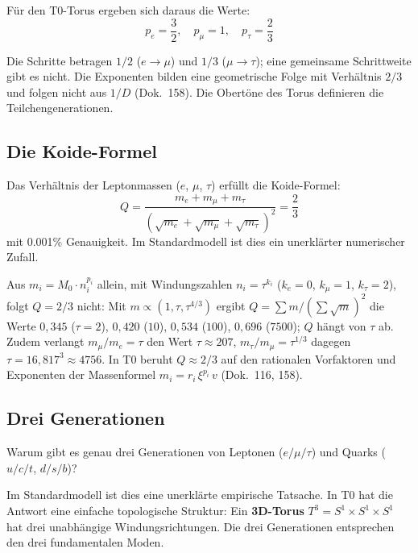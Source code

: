 	Für den T0-Torus ergeben sich daraus die Werte:
	\begin{equation}
		p_e = \frac{3}{2}, \quad p_\mu = 1, \quad p_\tau = \frac{2}{3}
	\end{equation}
	
	Die Schritte betragen $1/2$ ($e \to \mu$) und $1/3$ ($\mu \to \tau$); eine gemeinsame Schrittweite gibt es nicht. Die Exponenten bilden eine geometrische Folge mit Verhältnis $2/3$ und folgen nicht aus $1/D$ (Dok.~158). Die Obertöne des Torus definieren die Teilchengenerationen.
	
	\subsection{Die Koide-Formel}
	
	Das Verhältnis der Leptonmassen ($e$, $\mu$, $\tau$) erfüllt die Koide-Formel:
	\begin{equation}
		Q = \frac{m_e + m_\mu + m_\tau}{\left(\sqrt{m_e} + \sqrt{m_\mu} + \sqrt{m_\tau}\right)^2} = \frac{2}{3}
		\label{eq:koide}
	\end{equation}
	mit 0.001\% Genauigkeit. Im Standardmodell ist dies ein unerklärter numerischer Zufall.
	
	Aus $m_i = M_0 \cdot n_i^{p_i}$ allein, mit Windungszahlen $n_i = \tau^{k_i}$ ($k_e = 0$, $k_\mu = 1$, $k_\tau = 2$), folgt $Q = 2/3$ nicht: Mit $m \propto (1, \tau, \tau^{4/3})$ ergibt $Q = \sum m/(\sum\sqrt{m})^2$ die Werte $0{,}345$ ($\tau = 2$), $0{,}420$ ($10$), $0{,}534$ ($100$), $0{,}696$ ($7500$); $Q$ hängt von $\tau$ ab. Zudem verlangt $m_\mu/m_e = \tau$ den Wert $\tau \approx 207$, $m_\tau/m_\mu = \tau^{1/3}$ dagegen $\tau = 16{,}817^3 \approx 4756$. In T0 beruht $Q \approx 2/3$ auf den rationalen Vorfaktoren und Exponenten der Massenformel $m_i = r_i\,\xi^{p_i}\,v$ (Dok.~116, 158).
	
	\subsection{Drei Generationen}
	
	Warum gibt es genau drei Generationen von Leptonen ($e/\mu/\tau$) und Quarks ($u/c/t$, $d/s/b$)?
	
	Im Standardmodell ist dies eine unerklärte empirische Tatsache. In T0 hat die Antwort eine einfache topologische Struktur: Ein \textbf{3D-Torus} $T^3 = S^1 \times S^1 \times S^1$ hat drei unabhängige Windungsrichtungen. Die drei Generationen entsprechen den drei fundamentalen Moden.
	
